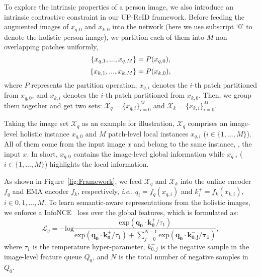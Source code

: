 \documentclass[10pt,twocolumn,letterpaper]{article}
\newcommand{\ieno}{\textit{i}.\textit{e}.}
\begin{document}
To explore the intrinsic properties of a person image, we also introduce an intrinsic contrastive constraint in our UP-ReID framework. Before feeding the augmented images of $x_{q,0}$ and $x_{k,0}$ into the network (here we use subscript `0' to denote the holistic person image), we partition each of them into $M$ non-overlapping patches uniformly,
\begin{equation}
    \mathcal\{{x}_{q,1}, ..., {x}_{q,M}\} = P(x_{q,0}),
    \label{AP for query}
\end{equation}
\vspace{-5mm}
\begin{equation}
    \mathcal\{{x}_{k,1}, ..., {x}_{k,M}\} = P(x_{k,0}),
    \label{AP for key}
\end{equation}
where $P$ represents the partition operation, $x_{q,i}$ denotes the $i$-th patch partitioned from $x_{q,0}$, and $x_{k,i}$ denotes the $i$-th patch partitioned from $x_{k,0}$. Then, we group them together and get two sets:
$\mathcal{X}_{q}=\{{x}_{q,i}\}^M_{i=0}$ and $\mathcal{X}_{k}=\{{x}_{k,i}\}^M_{i=0}$.

Taking the image set $\mathcal{X}_{q}$ as an example for illustration, $\mathcal{X}_{q}$ comprises an image-level holistic instance $x_{q,0}$ and $M$ patch-level local instances $x_{q,i}$ ($i \in \{1,...,M\}$). All of them come from the input image $x$ and belong to the same instance, \ie, the input $x$. In short, $x_{q,0}$ contains the image-level global information while $x_{q,i}$ ($i \in \{1,...,M\}$) highlights the local information. 


As shown in Figure~\ref{fig:Framework}, we feed $\mathcal{X}_{q}$ and $\mathcal{X}_{k}$ into the online encoder $f_q$ and EMA encoder $f_k$, respectively, \ieno, $q_i=f_q(x_{q,i})$ and $k^+_i=f_k(x_{k,i})$, $i \in {0,1,...,M}$. To learn semantic-aware representations from the holistic images, we enforce a InfoNCE~\cite{oord2018representation} loss over the global features, which is formulated as:
\begin{equation}
\label{global contrastive loss}
    \mathcal{L}_{g} = - \text{log}\frac{\text{exp}(\bm{q_0}\cdot\bm{k^+_0} / \tau_1)}{\text{exp}(\bm{q_0}\cdot\bm{k^+_0} / \tau_1) + \sum_{j=0}^{N-1} \text{exp}(\bm{q_0}\cdot\bm{k^-_{0,j}/\tau_1})},
\end{equation}
where $\tau_1$ is the temperature hyper-parameter, $k^-_{0,j}$ is the negative sample in the image-level feature queue $Q_0$, and $N$ is the total number of negative samples in $Q_0$.
\end{document}
